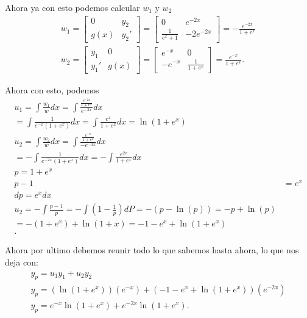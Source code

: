 \begin{enumerate}
\begin{enumerate}
	    Ahora ya con esto podemos calcular $w_1$ y $w_2$
	    \begin{align*}
	      w_1 = \begin{bmatrix} 0 & y_2 \\ g\left( x \right) & y_2' \end{bmatrix} = \begin{bmatrix} 0 & e^{-2x} \\ \frac{1}{e^{x}+1} & -2e^{-2x} \end{bmatrix} = -\frac{e^{-2x}}{1+e^{x}}\\
	      w_2 = \begin{bmatrix} y_1 & 0 \\ y_1' & g\left( x \right)  \end{bmatrix} = \begin{bmatrix} e^{-x} & 0 \\ -e^{-x} & \frac{1}{1+e^{x}} \end{bmatrix} = \frac{e^{-x}}{1+e^{x}}
	    .\end{align*}

	    Ahora con esto, podemos 
	    \begin{align*}
	      u_1 = \int \frac{w_1}{w}dx = \int \frac{\frac{e^{-2x}}{1+e^{x}}}{e^{-3x}}dx\\
	      = \int \frac{1}{e^{-x}\left( 1+e^{x} \right) }dx = \int \frac{e^{x}}{1+e^{x}}dx=\ln\left( 1+e^{x} \right) \\
	      u_2 = \int \frac{w_2}{w}dx = \int \frac{\frac{e^{-x}}{1+e^{x}}}{-e^{-3x}}dx\\
	      = - \int \frac{1}{e^{-2x}\left( 1+e^{x} \right) }dx = - \int \frac{e^{2x}}{1+e^{x}}dx\\
	      p = 1+e^{x}\\
	      p-1&= e^{x} \\
	      dp = e^{x}dx\\
	      u_2=-\int \frac{p-1}{p} = -\int\left( 1-\frac{1}{p} \right) dP = -\left( p-\ln\left( p \right)  \right) = -p + \ln\left( p \right)\\
	      = -\left( 1+e^{x} \right) + \ln\left( 1 + x \right)  = -1-e^{x}+\ln\left( 1+e^{x} \right) \\
	    .\end{align*}

	    Ahora por ultimo debemos reunir todo lo que sabemos hasta ahora, lo que nos deja con:
	    \begin{align*}
	      y_p = u_1y_1 + u_2y_2\\
	      y_p = \left( \ln\left( 1+e^{x} \right)  \right) \left( e^{-x} \right) + \left( -1-e^{x} + \ln\left( 1+e^{x} \right)  \right) \left( e^{-2x} \right) \\
	      y_p = e^{-x}\ln\left( 1+e^{x} \right) + e^{-2x}\ln\left( 1+e^{x} \right) 
	    .\end{align*}
	\end{enumerate}


\end{enumerate}
